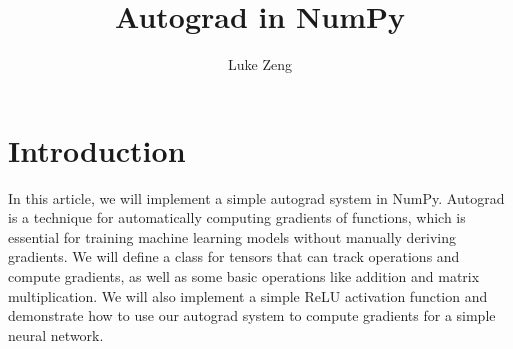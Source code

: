 \documentclass{article}
\title{Autograd in NumPy}
\author{Luke Zeng}
\date{}
\begin{document}
\maketitle

\section{Introduction}
In this article, we will implement a simple autograd system in NumPy. Autograd is a technique for automatically computing gradients of functions, which is essential for training machine learning models without manually deriving gradients. We will define a class for tensors that can track operations and compute gradients, as well as some basic operations like addition and matrix multiplication. We will also implement a simple ReLU activation function and demonstrate how to use our autograd system to compute gradients for a simple neural network.
\end{document}

